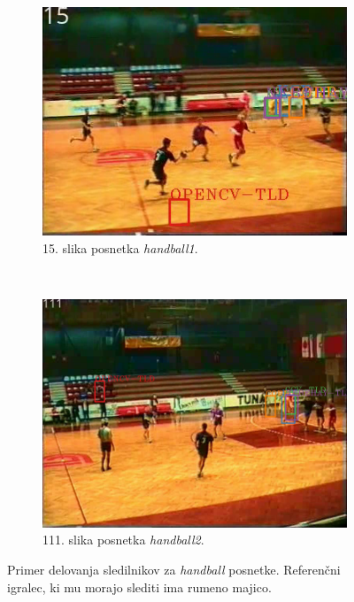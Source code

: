 \begin{figure}[!htbp]
	\centering
	
	\begin{subfigure}[t]{0.45\columnwidth}
		\includegraphics[width=\columnwidth]{./Slike/handball1-example.png}
		\caption{15. slika posnetka \textit{handball1}.}
		\label{fig:handball1}
	\end{subfigure}
	~
	\begin{subfigure}[t]{0.45\columnwidth}
		\includegraphics[width=\columnwidth]{./Slike/handball2-example.png}
		\caption{111. slika posnetka \textit{handball2}.}
		\label{fig:handball2}
	\end{subfigure}  
	\caption[Primer delovanja sledilnikov za \textit{handball} posnetke]{Primer delovanja sledilnikov za \textit{handball} posnetke. Referenčni igralec, ki mu morajo slediti ima rumeno majico. }
	\label{fig:tracker-visual}
\end{figure}




